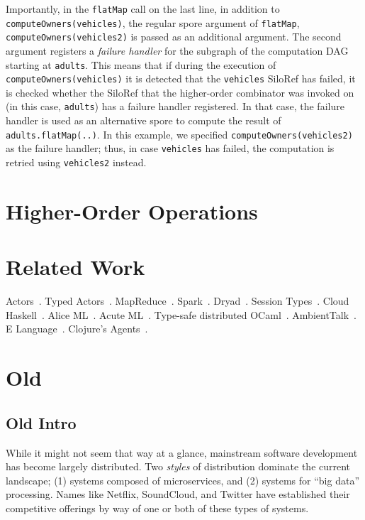 \documentclass[preprint]{sigplanconf}
\theoremstyle{definition}
\theoremstyle{definition}
\begin{document}
Importantly, in the \verb|flatMap| call on the last line, in addition to
\verb|computeOwners(vehicles)|, the regular spore argument of \verb|flatMap|,
\verb|computeOwners(vehicles2)| is passed as an additional argument. The
second argument registers a \emph{failure handler} for the subgraph of the
computation DAG starting at \verb|adults|. This means that if during the
execution of \verb|computeOwners(vehicles)| it is detected that the
\verb|vehicles| SiloRef has failed, it is checked whether the SiloRef that the
higher-order combinator was invoked on (in this case, \verb|adults|) has a
failure handler registered. In that case, the failure handler is used as an
alternative spore to compute the result of \verb|adults.flatMap(..)|. In this
example, we specified \verb|computeOwners(vehicles2)| as the failure handler;
thus, in case \verb|vehicles| has failed, the computation is retried using
\verb|vehicles2| instead.





\section{Higher-Order Operations}
\label{sec:higher-order-operations}


\section{Related Work}

Actors~\cite{Actors, ScalaActors}. Typed Actors~\cite{TypedActors}. MapReduce~\cite{MapReduce}. Spark~\cite{Spark}. Dryad~\cite{Dryad}. Session Types~\cite{SessionTypes}. Cloud Haskell~\cite{CloudHaskell}. Alice ML~\cite{AliceML}. Acute ML~\cite{AcuteML}. Type-safe distributed OCaml~\cite{DistOCaml}. AmbientTalk~\cite{AmbientTalk}. E Language~\cite{ELang}. Clojure's Agents~\cite{Clojure}.


\section{Old}

\subsection{Old Intro}


While it might not seem that way at a glance, mainstream software development
has become largely distributed. Two {\em styles} of distribution
dominate the current landscape; (1) systems composed of microservices,
and (2) systems for ``big data'' processing. Names like Netflix, SoundCloud,
and Twitter have established their competitive offerings by way of one or
both of these types of systems.
\end{document}
